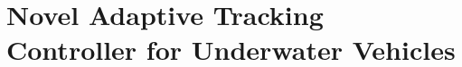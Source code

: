 \chapter{Novel Adaptive Tracking Controller for Underwater Vehicles}
\label{chUV_AMTC}

\ssp










